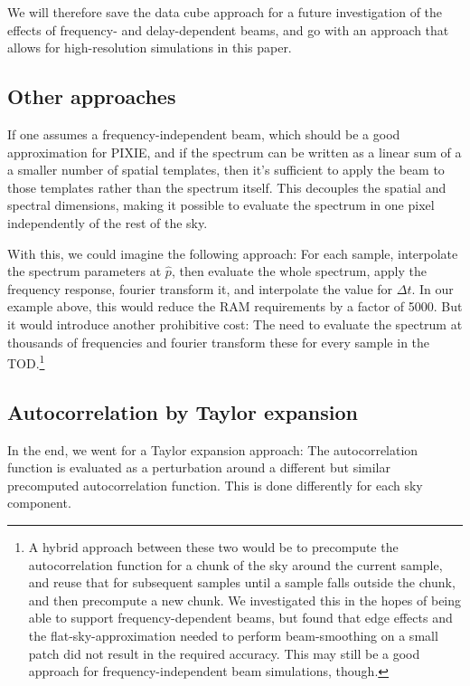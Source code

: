 \documentclass{article}
\begin{document}
We will therefore save the data cube approach for a future investigation of the
effects of frequency- and delay-dependent beams, and go with an approach that
allows for high-resolution simulations in this paper.

\subsection{Other approaches}
If one assumes a frequency-independent beam, which should be a good approximation
for PIXIE, and if the spectrum can be written as a linear sum of a a smaller
number of spatial templates, then it's sufficient to apply the beam to those
templates rather than the spectrum itself. This
decouples the spatial and spectral dimensions, making it possible to evaluate the
spectrum in one pixel independently of the rest of the sky.

With this, we could
imagine the following approach: For each sample, interpolate the spectrum parameters
at $\hat p$, then evaluate the whole spectrum, apply the frequency response,
fourier transform it,
and interpolate the value for $\Delta t$. In our example above, this would reduce
the RAM requirements by a factor of 5000. But it would introduce another prohibitive
cost: The need to evaluate the spectrum at thousands of frequencies and fourier transform
these for every sample in the TOD.\footnote{
A hybrid approach between these two would be to precompute the autocorrelation function
for a chunk of the sky around the current sample, and reuse that for subsequent samples
until a sample falls outside the chunk, and then precompute a new chunk. We investigated
this in the hopes of being able to support frequency-dependent beams, but found that
edge effects and the flat-sky-approximation needed to perform beam-smoothing on a small
patch did not result in the required accuracy. This may still be a good approach for
frequency-independent beam simulations, though.}

\subsection{Autocorrelation by Taylor expansion}
In the end, we went for a Taylor expansion approach: The autocorrelation function
is evaluated as a perturbation around a different but similar
precomputed autocorrelation function. This is done differently for each sky component.
\end{document}
